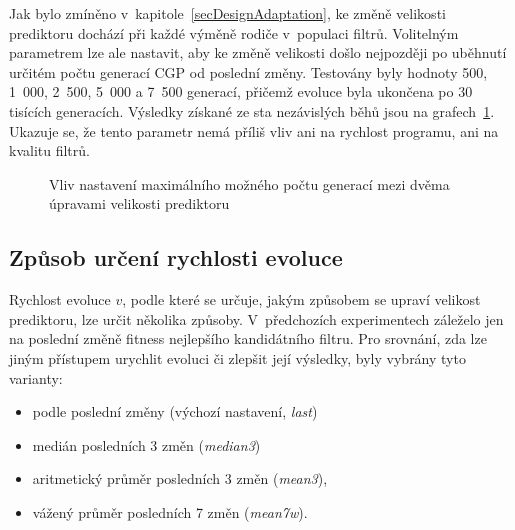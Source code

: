 Jak bylo zmíněno v~kapitole~\ref{secDesignAdaptation}, ke změně velikosti prediktoru dochází při každé výměně rodiče v~populaci filtrů. Volitelným parametrem lze ale nastavit, aby ke změně velikosti došlo nejpozději po uběhnutí určitém počtu generací CGP od poslední změny. Testovány byly hodnoty 500, 1~000, 2~500, 5~000 a 7~500 generací, přičemž evoluce byla ukončena po 30 tisících generacích. Výsledky získané ze sta nezávislých běhů jsou na grafech~\ref{plotInterval-30kg}. Ukazuje se, že tento parametr nemá příliš vliv ani na rychlost programu, ani na kvalitu filtrů.

\begin{figure}[htb]
    \centering
    \captionsetup{aboveskip=0pt}
    \caption{Vliv nastavení maximálního možného počtu generací mezi dvěma úpravami velikosti prediktoru}
    \label{plotInterval-30kg}
\end{figure}

\subsection{Způsob určení rychlosti evoluce}

Rychlost evoluce $v$, podle které se určuje, jakým způsobem se upraví velikost prediktoru, lze určit několika způsoby. V~předchozích experimentech záleželo jen na poslední změně fitness nejlepšího kandidátního filtru. Pro srovnání, zda lze jiným přístupem urychlit evoluci či zlepšit její výsledky, byly vybrány tyto varianty:

\begin{itemize}
    \item podle poslední změny (výchozí nastavení, \emph{last})
    \item medián posledních 3 změn (\emph{median3})
    \item aritmetický průměr posledních 3 změn (\emph{mean3}),
    \item vážený průměr posledních 7 změn (\emph{mean7w}).
\end{itemize}

